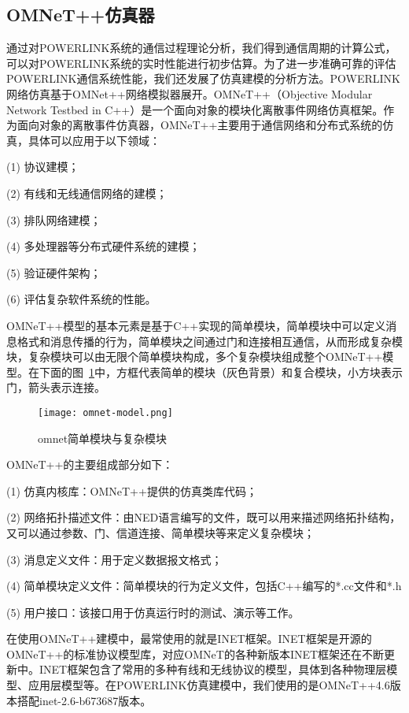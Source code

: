 \subsection{OMNeT++仿真器}
通过对POWERLINK系统的通信过程理论分析，我们得到通信周期的计算公式，可以对POWERLINK系统的实时性能进行初步估算。为了进一步准确可靠的评估POWERLINK通信系统性能，我们还发展了仿真建模的分析方法。POWERLINK网络仿真基于OMNet++网络模拟器展开。OMNeT++（Objective Modular Network Testbed in C++）是一个面向对象的模块化离散事件网络仿真框架\cite{omnet}。作为面向对象的离散事件仿真器，OMNeT++主要用于通信网络和分布式系统的仿真，具体可以应用于以下领域\cite{gao2015,xu2014,liu2015}：

(1) 协议建模；

(2) 有线和无线通信网络的建模；

(3) 排队网络建模；

(4) 多处理器等分布式硬件系统的建模；

(5) 验证硬件架构；

(6) 评估复杂软件系统的性能。

OMNeT++模型的基本元素是基于C++实现的简单模块，简单模块中可以定义消息格式和消息传播的行为，简单模块之间通过门和连接相互通信，从而形成复杂模块，复杂模块可以由无限个简单模块构成，多个复杂模块组成整个OMNeT++模型。在下面的图~\ref{fig:omnet-model}中，方框代表简单的模块（灰色背景）和复合模块，小方块表示门，箭头表示连接\cite{wu2006}。
\begin{figure}[!htb]
  \centering
  \texttt{[image: omnet-model.png]}
  \caption{omnet简单模块与复杂模块}
  \label{fig:omnet-model}
\end{figure}

OMNeT++的主要组成部分如下：

(1) 仿真内核库：OMNeT++提供的仿真类库代码；

(2) 网络拓扑描述文件：由NED语言编写的文件，既可以用来描述网络拓扑结构，又可以通过参数、门、信道连接、简单模块等来定义复杂模块；

(3) 消息定义文件：用于定义数据报文格式；
 
(4) 简单模块定义文件：简单模块的行为定义文件，包括C++编写的*.cc文件和*.h
 
(5) 用户接口：该接口用于仿真运行时的测试、演示等工作。

在使用OMNeT++建模中，最常使用的就是INET框架。INET框架是开源的OMNeT++的标准协议模型库，对应OMNeT的各种新版本INET框架还在不断更新中。INET框架包含了常用的多种有线和无线协议的模型，具体到各种物理层模型、应用层模型等。在POWERLINK仿真建模中，我们使用的是OMNeT++4.6版本搭配inet-2.6-b673687版本。

